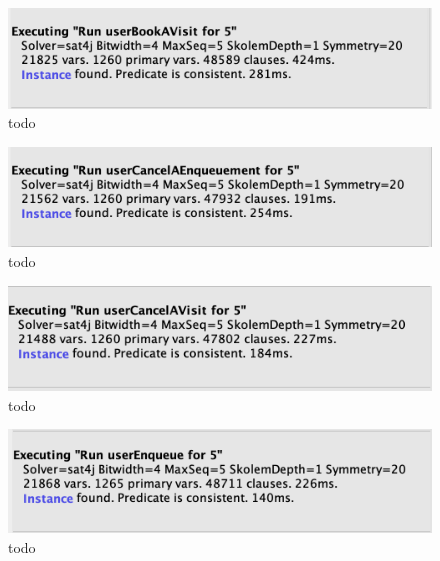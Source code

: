 \begin{figure}[h!]
    \centering
    \includegraphics[width=\textwidth]{Images/alloy/userbooksavisit.png}
    \caption{\label{fig:userbooksavisitalloy}{todo}}
\end{figure}

\begin{figure}[h!]
    \centering
    \includegraphics[width=\textwidth]{Images/alloy/usercancelsanenqueuement.png}
    \caption{\label{fig:usercancelsanenqueuementalloy}{todo}}
\end{figure}

\begin{figure}[h!]
    \centering
    \includegraphics[width=\textwidth]{Images/alloy/usercancelsavisit.png}
    \caption{\label{fig:usercancelsavisitalloy}{todo}}
\end{figure}

\begin{figure}[h!]
    \centering
    \includegraphics[width=\textwidth]{Images/alloy/userenqueue.png}
    \caption{\label{fig:usernenqueuealloy}{todo}}
\end{figure}